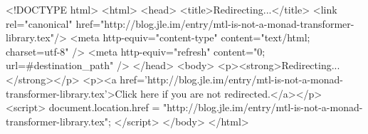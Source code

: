 <!DOCTYPE html>
<html>
<head>
<title>Redirecting...</title>
<link rel="canonical" href="http://blog.jle.im/entry/mtl-is-not-a-monad-transformer-library.tex"/>
<meta http-equiv="content-type" content="text/html; charset=utf-8" />
<meta http-equiv="refresh" content="0; url=#{destination_path}" />
</head>
<body>
  <p><strong>Redirecting...</strong></p>
  <p><a href='http://blog.jle.im/entry/mtl-is-not-a-monad-transformer-library.tex'>Click here if you are not redirected.</a></p>
  <script>
    document.location.href = "http://blog.jle.im/entry/mtl-is-not-a-monad-transformer-library.tex";
  </script>
</body>
</html>
